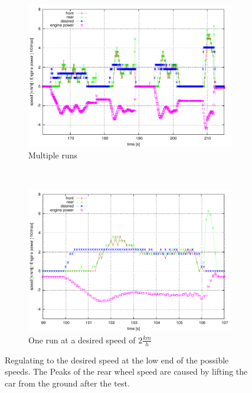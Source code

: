 \documentclass[a4paper
               ,10pt
               ,DIV=10 %
               ,BCOR=0.3cm
               ,pagesize %
               ,headings=small
               ,bibtotoc
               ]
               {scrartcl}
\begin{document}
\begin{figure}[H]
  \centering
  \begin{subfigure}[b]{0.5\textwidth}
    \centering
    \includegraphics[width=\textwidth]{pic/plot_slow/plot.pdf}
    \caption{Multiple runs}
  \end{subfigure}~
  \begin{subfigure}[b]{0.5\textwidth}
    \centering
    \includegraphics[width=\textwidth]{pic/plot_slow2/plot.pdf}
    \caption{One run at a desired speed of $2 \frac{km}{h}$}
  \end{subfigure}
  \caption{Regulating to the desired speed at the low end of the possible speeds. The Peaks of the rear wheel speed are caused by lifting the car from the ground after the test.}
  \label{figand2}
\end{figure}
\end{document}
